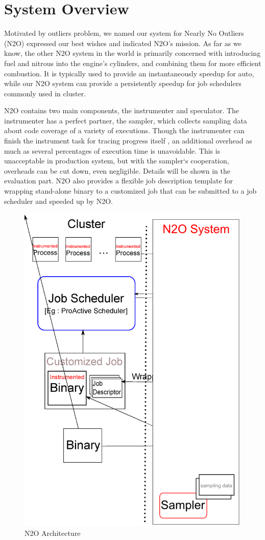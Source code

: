 \section{System Overview}

Motivated by outliers problem, we named our system for Nearly No Outliers (N2O) expressed our best wishes and indicated N2O’s mission. As far as we know, the other N2O system in the world is primarily concerned with introducing fuel and nitrous into the engine's cylinders, and combining them for more efficient combustion. It is typically used to provide an instantaneously speedup for auto, while our N2O system can provide a persistently speedup for job schedulers commonly used in cluster.

N2O contains two main components, the instrumenter and speculator. The instrumenter has a perfect partner, the sampler, which collects sampling data about code coverage of a variety of executions. Though the instrumenter can finish the instrument task for tracing progress itself , an additional overhead as much as several percentages of execution time is unavoidable. This is unacceptable in production system, but with the sampler‘s cooperation, overheads can be cut down, even negligible. Details will be shown in the evaluation part. N2O also provides a flexible job description template for wrapping stand-alone binary to a customized job that can be submitted to a job scheduler and speeded up by N2O.

\begin{figure}
\centering
\includegraphics[width=0.9\columnwidth]{figures/N2O_arch.eps}
\caption{N2O Architecture}
\label{figure:n2oarch}
\end{figure}

